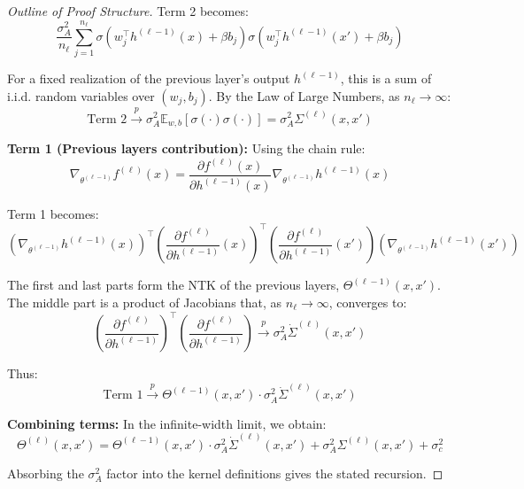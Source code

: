 \documentclass[a4paper]{article}
\theoremstyle{plain}
\theoremstyle{definition}
\theoremstyle{remark}
\begin{document}
\begin{proof}[Outline of Proof Structure]
Term 2 becomes:
\begin{equation}
\frac{\sigma_A^2}{n_\ell} \sum_{j=1}^{n_\ell} \sigma(w_j^\top h^{(\ell-1)}(x) + \beta b_j) \sigma(w_j^\top h^{(\ell-1)}(x') + \beta b_j)
\end{equation}

For a fixed realization of the previous layer's output $h^{(\ell-1)}$, this is a sum of i.i.d. random variables over $(w_j, b_j)$. By the Law of Large Numbers, as $n_\ell \to \infty$:
\begin{equation}
\text{Term 2} \xrightarrow{p} \sigma_A^2 \mathbb{E}_{w,b} \left[ \sigma(\cdot) \sigma(\cdot) \right] = \sigma_A^2 \Sigma^{(\ell)}(x, x')
\end{equation}

\textbf{Term 1 (Previous layers contribution):} Using the chain rule:
\begin{equation}
\nabla_{\theta^{(\ell-1)}} f^{(\ell)}(x) = \frac{\partial f^{(\ell)}(x)}{\partial h^{(\ell-1)}(x)} \nabla_{\theta^{(\ell-1)}} h^{(\ell-1)}(x)
\end{equation}

Term 1 becomes:
\begin{equation}
(\nabla_{\theta^{(\ell-1)}} h^{(\ell-1)}(x))^\top \left(\frac{\partial f^{(\ell)}}{\partial h^{(\ell-1)}}(x)\right)^\top \left(\frac{\partial f^{(\ell)}}{\partial h^{(\ell-1)}}(x')\right) (\nabla_{\theta^{(\ell-1)}} h^{(\ell-1)}(x'))
\end{equation}

The first and last parts form the NTK of the previous layers, $\Theta^{(\ell-1)}(x, x')$. The middle part is a product of Jacobians that, as $n_\ell \to \infty$, converges to:
\begin{equation}
\left(\frac{\partial f^{(\ell)}}{\partial h^{(\ell-1)}}\right)^\top \left(\frac{\partial f^{(\ell)}}{\partial h^{(\ell-1)}}\right) \xrightarrow{p} \sigma_A^2 \dot{\Sigma}^{(\ell)}(x, x')
\end{equation}

Thus:
\begin{equation}
\text{Term 1} \xrightarrow{p} \Theta^{(\ell-1)}(x, x') \cdot \sigma_A^2 \dot{\Sigma}^{(\ell)}(x, x')
\end{equation}

\textbf{Combining terms:} In the infinite-width limit, we obtain:
\begin{equation}
\Theta^{(\ell)}(x, x') = \Theta^{(\ell-1)}(x, x') \cdot \sigma_A^2 \dot{\Sigma}^{(\ell)}(x, x') + \sigma_A^2 \Sigma^{(\ell)}(x, x') + \sigma_c^2
\end{equation}

Absorbing the $\sigma_A^2$ factor into the kernel definitions gives the stated recursion.
\end{proof}
\end{document}
